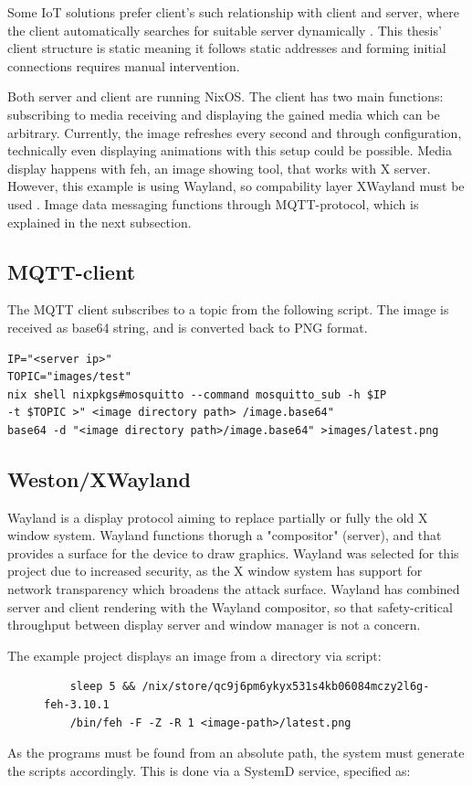 Some IoT solutions prefer client's such relationship with client and server, where the client automatically searches for suitable server dynamically \cite{kandoi2021operating}. This thesis' client structure is static meaning it follows static addresses and forming initial connections requires manual intervention.

Both server and client are running NixOS. The client has two main functions: subscribing to media receiving and displaying the gained media which can be arbitrary. Currently, the image refreshes every second and through configuration, technically even displaying animations with this setup could be possible. Media display happens with feh, an image showing tool, that works with X server. However, this example is using Wayland, so compability layer XWayland must be used \cite{waylandWayland}. Image data messaging functions through MQTT-protocol, which is explained in the next subsection.

\subsection{MQTT-client}
The MQTT client subscribes to a topic from the following script. The image is received as base64 string, and is converted back to PNG format.
\begin{lstlisting}
IP="<server ip>"
TOPIC="images/test"
nix shell nixpkgs#mosquitto --command mosquitto_sub -h $IP 
-t $TOPIC >" <image directory path> /image.base64"
base64 -d "<image directory path>/image.base64" >images/latest.png
\end{lstlisting}
\subsection{Weston/XWayland}
Wayland is a display protocol aiming to replace partially or fully the old X window system. Wayland functions thorugh a "compositor" (server), and that provides a surface for the device to draw graphics. Wayland was selected for this project due to increased security, as the X window system has support for network transparency which broadens the attack surface. Wayland has combined server and client rendering with the Wayland compositor, so that safety-critical throughput between display server and window manager is not a concern. \cite{waylandWayland} %

The example project displays an image from a directory via script:
\begin{figure}[H]
\begin{lstlisting} 
    sleep 5 && /nix/store/qc9j6pm6ykyx531s4kb06084mczy2l6g-feh-3.10.1
    /bin/feh -F -Z -R 1 <image-path>/latest.png
\end{lstlisting}
\label{fehscript}
\end{figure}
As the programs must be found from an absolute path, the system must generate the scripts accordingly. This is done via a SystemD service, specified as:



